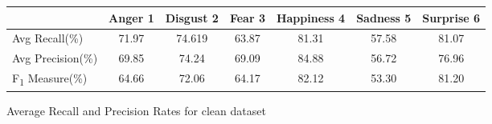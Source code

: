 \begin{figure}[h]
\begin{center}
\caption{Average Recall and Precision Rates for clean dataset}
\begin{tabular}{ | l || c | c | c | c | c | c | }
    \hline
          & Anger 1 & Disgust 2 & Fear 3 & Happiness 4 & Sadness 5 & Surprise 6 \\ \hline \hline
        Avg Recall(\%) & 71.97 & 74.619 & 63.87 & 81.31 & 57.58 & 81.07 \\ \hline
        Avg Precision(\%) & 69.85 & 74.24 & 69.09  & 84.88 & 56.72 & 76.96 \\ \hline
        F\textsubscript{1} Measure(\%) & 64.66 & 72.06 & 64.17 & 82.12 & 53.30 & 81.20 \\ \hline
    \end{tabular}
    \label{fig:averageRecall}
\end{center}
\end{figure}

